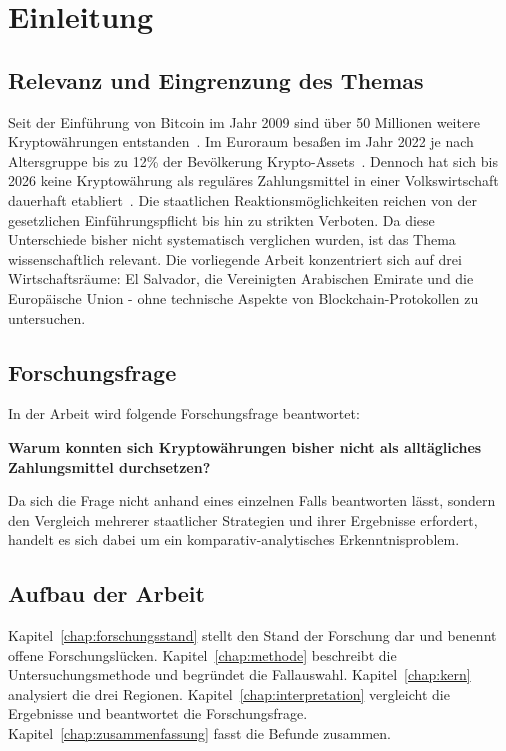 \chapter{Einleitung}
\label{chap:einleitung}

\section{Relevanz und Eingrenzung des Themas}

Seit der Einführung von Bitcoin im Jahr 2009 sind über 50 Millionen weitere Kryptowährungen entstanden~\cite{yieldfund_crypto2025}. Im Euroraum besaßen im Jahr 2022 je nach Altersgruppe bis zu 12\% der Bevölkerung Krypto-Assets~\cite{BundesbankMiCAR}. Dennoch hat sich bis 2026 keine Kryptowährung als reguläres Zahlungsmittel in einer Volkswirtschaft dauerhaft etabliert~\cite{Ammous2018, Alvarez2023, BundesbankMiCAR}.
Die staatlichen Reaktionsmöglichkeiten reichen von der gesetzlichen Einführungspflicht bis hin zu strikten Verboten. Da diese Unterschiede bisher nicht systematisch verglichen wurden, ist das Thema wissenschaftlich relevant.
Die vorliegende Arbeit konzentriert sich auf drei Wirtschaftsräume: El Salvador, die Vereinigten Arabischen Emirate und die Europäische Union - ohne technische Aspekte von Blockchain-Protokollen zu untersuchen.

\section{Forschungsfrage}

In der Arbeit wird folgende Forschungsfrage beantwortet:
\begin{center}
    \textbf{Warum konnten sich Kryptowährungen bisher nicht als alltägliches Zahlungsmittel durchsetzen?}
\end{center}

Da sich die Frage nicht anhand eines einzelnen Falls beantworten lässt, sondern den Vergleich mehrerer staatlicher Strategien und ihrer Ergebnisse erfordert, handelt es sich dabei um ein komparativ-analytisches Erkenntnisproblem.

\section{Aufbau der Arbeit}
Kapitel~\ref{chap:forschungsstand} stellt den Stand der Forschung dar und benennt offene Forschungslücken. Kapitel~\ref{chap:methode} beschreibt die Untersuchungsmethode und begründet die Fallauswahl. Kapitel~\ref{chap:kern} analysiert die drei Regionen. Kapitel~\ref{chap:interpretation} vergleicht die Ergebnisse und beantwortet die Forschungsfrage. Kapitel~\ref{chap:zusammenfassung} fasst die Befunde zusammen.